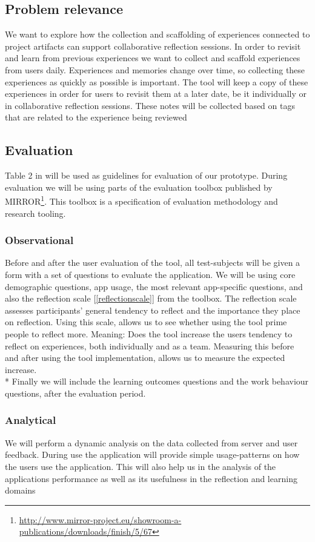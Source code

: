 \subsection{Problem relevance}
We want to explore how the collection and scaffolding of experiences connected to project artifacts can support collaborative reflection sessions. In order to revisit and learn from previous experiences we want to collect and scaffold experiences from users daily. Experiences and memories change over time, so collecting these experiences as quickly as possible is important. The tool will keep a copy of these experiences in order for users to revisit them at a later date, be it individually or in collaborative reflection sessions. These notes will be collected based on tags that are related to the experience being reviewed \cite{Hassan-montero2006}

\subsection{Evaluation}
Table 2 in \cite{Esearch2004} will be used as guidelines for evaluation of our prototype. 
During evaluation we will be using parts of the evaluation toolbox published by MIRROR\footnote{\url{http://www.mirror-project.eu/showroom-a-publications/downloads/finish/5/67}}. This toolbox is a specification of evaluation methodology and research tooling. 

\subsubsection{Observational}
Before and after the user evaluation of the tool, all test-subjects will be given a form with a set of questions to evaluate the application. We will be using core demographic questions, app usage, the most relevant app-specific questions, and also the reflection scale [\ref{reflectionscale}] from the toolbox. The reflection scale assesses participants' general tendency to reflect and the importance they place on reflection. Using this scale, allows us to see whether using the tool prime people to reflect more. Meaning: Does the tool increase the users tendency to reflect on experiences, both individually and as a team. Measuring this before and after using the tool implementation, allows us to measure the expected increase. \\*
Finally we will include the learning outcomes questions and the work behaviour questions, after the evaluation period.  

\subsubsection{Analytical}
We will perform a dynamic analysis on the data collected from server and user feedback. During use the application will provide simple usage-patterns on how the users use the application.
This will also help us in the analysis of the applications performance as well as its usefulness in the reflection and learning domains

